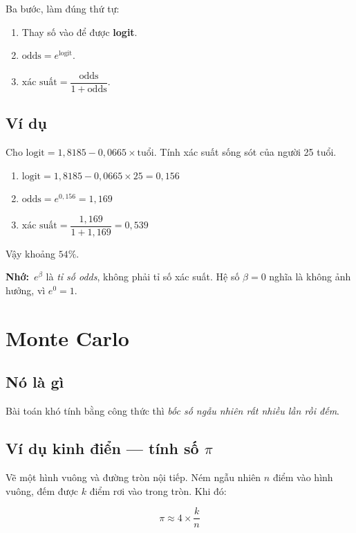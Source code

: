 \documentclass[12pt]{article}
\newcommand{\nho}{\textbf{Nhớ:}\ }
\begin{document}
Ba bước, làm đúng thứ tự:

\begin{enumerate}
\item Thay số vào để được \textbf{logit}.
\item $\text{odds} = e^{\text{logit}}$.
\item $\text{xác suất} = \dfrac{\text{odds}}{1+\text{odds}}$.
\end{enumerate}

\subsection*{Ví dụ}

Cho $\text{logit} = 1{,}8185 - 0{,}0665 \times \text{tuổi}$. Tính xác suất sống sót
của người 25 tuổi.

\begin{enumerate}
\item $\text{logit} = 1{,}8185 - 0{,}0665 \times 25 = 0{,}156$
\item $\text{odds} = e^{0{,}156} = 1{,}169$
\item $\text{xác suất} = \dfrac{1{,}169}{1 + 1{,}169} = 0{,}539$
\end{enumerate}

Vậy khoảng $54\%$.

\nho $e^{\beta}$ là \emph{tỉ số odds}, không phải tỉ số xác suất. Hệ số $\beta = 0$
nghĩa là không ảnh hưởng, vì $e^0 = 1$.

\section{Monte Carlo}

\subsection*{Nó là gì}

Bài toán khó tính bằng công thức thì \emph{bốc số ngẫu nhiên rất nhiều lần rồi đếm}.

\subsection*{Ví dụ kinh điển --- tính số $\pi$}

Vẽ một hình vuông và đường tròn nội tiếp. Ném ngẫu nhiên $n$ điểm vào hình vuông,
đếm được $k$ điểm rơi vào trong tròn. Khi đó:

\[
\pi \approx 4 \times \frac{k}{n}
\]
\end{document}
